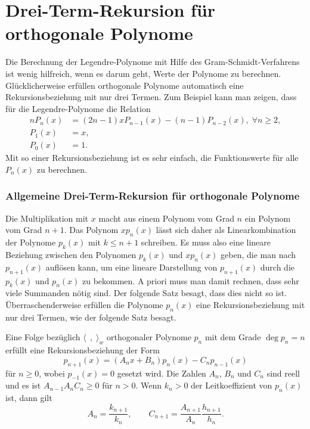 %
%
%
\section{Drei-Term-Rekursion für orthogonale Polynome
\label{buch:orthogonal:section:drei-term-rekursion}}
Die Berechnung der Legendre-Polynome mit Hilfe des Gram-Schmidt-Verfahrens
ist wenig hilfreich, wenn es darum geht, Werte der Polynome zu berechnen.
Glücklicherweise erfüllen orthogonale Polynome automatisch eine 
Rekursionsbeziehung mit nur drei Termen.
Zum Beispiel kann man zeigen, dass für die Legendre-Polynome die
Relation
\begin{align*}
nP_n(x) &= (2n-1)xP_{n-1}(x) - (n-1)P_{n-2}(x),\;\forall n\ge 2,
\\
P_1(x) &= x,
\\
P_0(x) &= 1.
\end{align*}
Mit so einer Rekursionsbeziehung ist es sehr einfach, die Funktionswerte
für alle $P_n(x)$ zu berechnen.

%
%
\subsubsection{Allgemeine Drei-Term-Rekursion für orthogonale Polynome}
Die Multiplikation mit $x$ macht aus einem Polynom vom Grad $n$ ein
Polynom vom Grad $n+1$.
Das Polynom $xp_n(x)$ lässt sich daher als Linearkombination der
Polynome $p_k(x)$ mit $k\le n+1$ schreiben.
Es muss also eine lineare Beziehung zwischen den Polynomen $p_k(x)$ und
$xp_n(x)$ geben, die man nach $p_{n+1}(x)$ auflösen kann, um eine lineare
Darstellung von $p_{n+1}(x)$ durch die $p_k(x)$ und $p_n(x)$ zu
bekommen.
A priori muss man damit rechnen, dass sehr viele Summanden nötig sind.
Der folgende Satz besagt, dass dies nicht so ist.
Überraschenderweise erfüllen die Polynome $p_n(x)$ eine Rekursionsbeziehung
mit nur drei Termen, wie der folgende Satz besagt.

\begin{satz}
%
\label{buch:orthogonal:satz:drei-term-rekursion}
Eine Folge bezüglich $\langle\,\;,\;\rangle_w$ orthogonaler Polynome $p_n$ 
mit dem Grade $\deg p_n = n$ erfüllt eine Rekursionsbeziehung der Form
\begin{equation}
p_{n+1}(x)
=
(A_nx+B_n)p_n(x) - C_np_{n-1}(x)
\label{buch:orthogonal:eqn:rekursion}
\end{equation}
für $n\ge 0$, wobei $p_{-1}(x)=0$ gesetzt wird.
Die Zahlen $A_n$, $B_n$ und $C_n$ sind reell und es ist
$A_{n-1}A_nC_n\ge 0$ für $n>0$. 
Wenn $k_n>0$ der Leitkoeffizient von $p_n(x)$ ist, dann gilt
\begin{equation}
A_n=\frac{k_{n+1}}{k_n},
\qquad
C_{n+1} = \frac{A_{n+1}}{A_n}\frac{h_{n+1}}{h_n}.
\label{buch:orthogonal:eqn:koeffizientenrelation}
\end{equation}
\end{satz}

